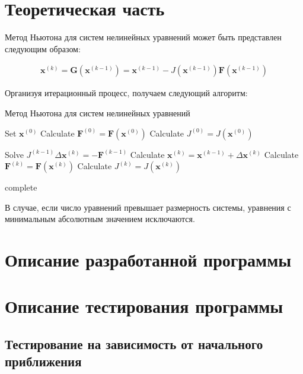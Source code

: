 \documentclass[12pt, a4paper]{article}
\begin{document}
\section{Теоретическая часть}
\noindent Метод Ньютона для систем нелинейных уравнений может быть представлен следующим образом:

\begin{align*}
  \textbf{x}^{(k)}  = \textbf{G}(\textbf{x}^{(k-1)}) 
                    = \textbf{x}^{(k-1)} - J(\textbf{x}^{(k-1)})\textbf{F}(\textbf{x}^{(k-1)})
\end{align*}
\vspace{1mm}

\noindent Организуя итерационный процесс, получаем следующий алгоритм:

\begin{algorithm}[H]
\caption{Метод Ньютона для систем нелинейных уравнений}\label{alg:newton}

\begin{algorithmic}
\State Set $\textbf{x}^{(0)}$
\State Calculate $\textbf{F}^{(0)} = \textbf{F}(\textbf{x}^{(0)})$
\State Calculate $J^{(0)} = J(\textbf{x}^{(0)})$

\State Solve $J^{(k-1)}\Delta\textbf{x}^{(k)} = -\textbf{F}^{(k-1)}$
\State Calculate $\textbf{x}^{(k)} = \textbf{x}^{(k-1)} + \Delta\textbf{x}^{(k)}$
\State Calculate $\textbf{F}^{(k)} = \textbf{F}(\textbf{x}^{(k)})$
\State Calculate $J^{(k)} = J(\textbf{x}^{(k)})$

\State complete
\EndIf

\EndFor
\end{algorithmic}
\end{algorithm}

\noindent В случае, если число уравнений превышает размерность системы, уравнения с минимальным абсолютным
значением исключаются.

\section{Описание разработанной программы}

\section{Описание тестирования программы}
\subsection{Тестирование на зависимость от начального приближения}
\end{document}
